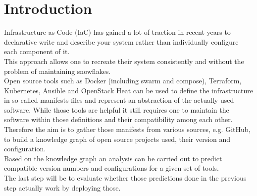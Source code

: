 \chapter{Introduction}
Infrastructure as Code (IaC) has gained a lot of traction in recent years to declarative write and describe your system rather than individually configure each component of it.\\
This approach allows one to recreate their system consistently and without the problem of maintaining snowflakes.\\
Open source tools such as Docker (including swarm and compose), Terraform, Kubernetes, Ansible and OpenStack Heat can be used to define the infrastructure in so called manifests files and represent an abstraction of the actually used software. While those tools are helpful it still requires one to maintain the software within those definitions and their compatibility among each other.\\
Therefore the aim is to gather those manifests from various sources, e.g. GitHub, to build a knowledge graph of open source projects used, their version and configuration.\\
Based on the knowledge graph an analysis can be carried out to predict compatible version numbers and configurations for a given set of tools.\\
The last step will be to evaluate whether those predictions done in the previous step actually work by deploying those.

